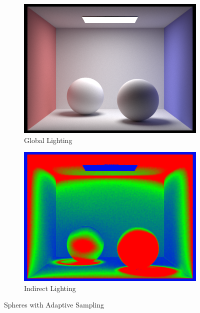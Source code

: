\documentclass{article}
\begin{document}
\begin{figure}[htb!]
\begin{subfigure}[h]{0.4\textwidth}
\includegraphics[width=\textwidth]{task5/spheres2048.png}
\caption{Global Lighting}
\end{subfigure}
\hfill\vrule\hfill
\begin{subfigure}[h]{0.4\textwidth}
\includegraphics[width=\textwidth]{task5/spheres2048_rate.png}
\caption{Indirect Lighting}
\end{subfigure}%

\caption[f2]{Spheres with Adaptive Sampling}
\end{figure}
\end{document}
